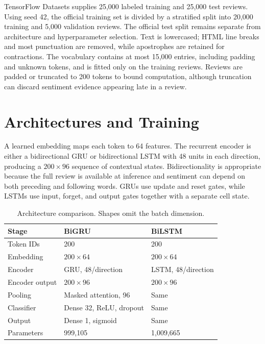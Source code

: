 \documentclass[conference]{IEEEtran}
\begin{document}
TensorFlow Datasets supplies 25,000 labeled training and 25,000 test reviews. Using seed 42, the official training set is divided by a stratified split into 20,000 training and 5,000 validation reviews. The official test split remains separate from architecture and hyperparameter selection. Text is lowercased; HTML line breaks and most punctuation are removed, while apostrophes are retained for contractions. The vocabulary contains at most 15,000 entries, including padding and unknown tokens, and is fitted only on the training reviews. Reviews are padded or truncated to 200 tokens to bound computation, although truncation can discard sentiment evidence appearing late in a review.

\section{Architectures and Training}
A learned embedding maps each token to 64 features. The recurrent encoder is either a bidirectional GRU or bidirectional LSTM with 48 units in each direction, producing a $200\times96$ sequence of contextual states. Bidirectionality is appropriate because the full review is available at inference and sentiment can depend on both preceding and following words. GRUs use update and reset gates, while LSTMs use input, forget, and output gates together with a separate cell state.

\begin{table}[!t]
\caption{Architecture comparison. Shapes omit the batch dimension.}
\label{tab:architecture}
\centering
\footnotesize
\setlength{\tabcolsep}{3.5pt}
\begin{tabular}{@{}lll@{}}
\toprule
Stage & BiGRU & BiLSTM\\
\midrule
Token IDs & 200 & 200\\
Embedding & $200\times64$ & $200\times64$\\
Encoder & GRU, 48/direction & LSTM, 48/direction\\
Encoder output & $200\times96$ & $200\times96$\\
Pooling & Masked attention, 96 & Same\\
Classifier & Dense 32, ReLU, dropout & Same\\
Output & Dense 1, sigmoid & Same\\
Parameters & 999,105 & 1,009,665\\
\bottomrule
\end{tabular}
\end{table}
\end{document}
